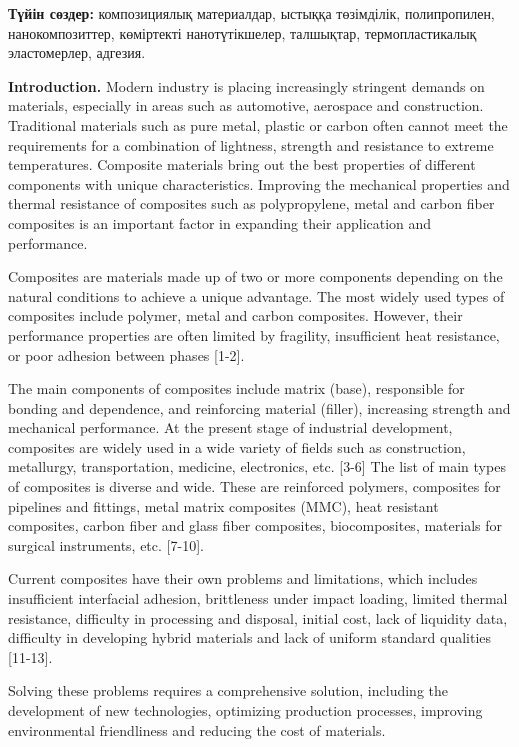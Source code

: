 {\bfseries Түйін сөздер:} композициялық материалдар, ыстыққа төзімділік,
полипропилен, нанокомпозиттер, көміртекті нанотүтікшелер, талшықтар,
термопластикалық эластомерлер, адгезия.

\begin{multicols}{2}
{\bfseries Introduction.} Modern industry is placing increasingly stringent
demands on materials, especially in areas such as automotive, aerospace
and construction. Traditional materials such as pure metal, plastic or
carbon often cannot meet the requirements for a combination of
lightness, strength and resistance to extreme temperatures. Composite
materials bring out the best properties of different components with
unique characteristics. Improving the mechanical properties and thermal
resistance of composites such as polypropylene, metal and carbon fiber
composites is an important factor in expanding their application and
performance.

Composites are materials made up of two or more components depending on
the natural conditions to achieve a unique advantage. The most widely
used types of composites include polymer, metal and carbon composites.
However, their performance properties are often limited by fragility,
insufficient heat resistance, or poor adhesion between phases {[}1-2{]}.

The main components of composites include matrix (base), responsible for
bonding and dependence, and reinforcing material (filler), increasing
strength and mechanical performance. At the present stage of industrial
development, composites are widely used in a wide variety of fields such
as construction, metallurgy, transportation, medicine, electronics, etc.
{[}3-6{]} The list of main types of composites is diverse and wide.
These are reinforced polymers, composites for pipelines and fittings,
metal matrix composites (MMC), heat resistant composites, carbon fiber
and glass fiber composites, biocomposites, materials for surgical
instruments, etc. {[}7-10{]}.

Current composites have their own problems and limitations, which
includes insufficient interfacial adhesion, brittleness under impact
loading, limited thermal resistance, difficulty in processing and
disposal, initial cost, lack of liquidity data, difficulty in developing
hybrid materials and lack of uniform standard qualities {[}11-13{]}.

Solving these problems requires a comprehensive solution, including the
development of new technologies, optimizing production processes,
improving environmental friendliness and reducing the cost of materials.


\end{multicols}
